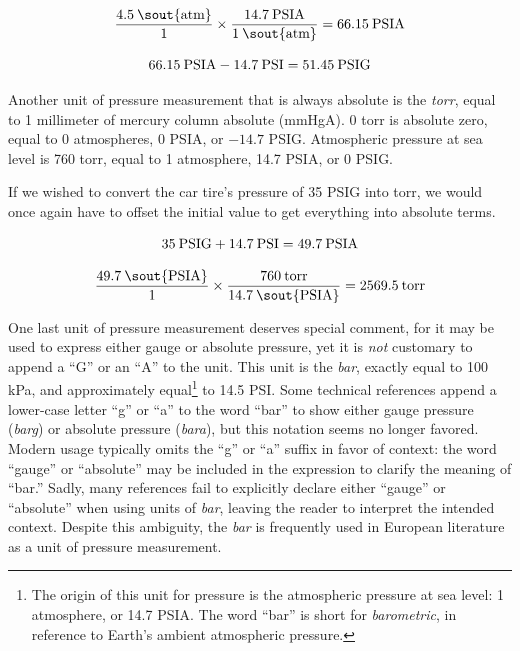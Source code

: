 $${{4.5 \> \hbox{\sout{atm}}} \over 1} \times {{14.7 \> \hbox{PSIA}} \over {1 \> \hbox{\sout{atm}}}} = 66.15 \> \hbox{PSIA}$$

$$66.15 \> \hbox{PSIA} - 14.7 \> \hbox{PSI} = 51.45 \> \hbox{PSIG}$$

Another unit of pressure measurement that is always absolute is the \textit{torr}, equal to 1 millimeter of mercury column absolute (mmHgA).  0 torr is absolute zero, equal to 0 atmospheres, 0 PSIA, or $-14.7$ PSIG.  Atmospheric pressure at sea level is 760 torr, equal to 1 atmosphere, 14.7 PSIA, or 0 PSIG. 

If we wished to convert the car tire's pressure of 35 PSIG into torr, we would once again have to offset the initial value to get everything into absolute terms.

$$35 \> \hbox{PSIG} + 14.7 \> \hbox{PSI} = 49.7 \> \hbox{PSIA}$$

$${{49.7 \> \hbox{\sout{PSIA}}} \over 1} \times {{760 \> \hbox{torr}} \over {14.7 \> \hbox{\sout{PSIA}}}} = 2569.5 \> \hbox{torr}$$

\vskip 10pt

One last unit of pressure measurement deserves special comment, for it may be used to express either gauge or absolute pressure, yet it is \textit{not} customary to append a ``G'' or an ``A'' to the unit.  This unit is the \textit{bar}, exactly equal to 100 kPa, and approximately equal\footnote{The origin of this unit for pressure is the atmospheric pressure at sea level: 1 atmosphere, or 14.7 PSIA.  The word ``bar'' is short for \textit{barometric}, in reference to Earth's ambient atmospheric pressure.} to 14.5 PSI.  Some technical references append a lower-case letter ``g'' or ``a'' to the word ``bar'' to show either gauge pressure (\textit{barg}) or absolute pressure (\textit{bara}), but this notation seems no longer favored.  Modern usage typically omits the ``g'' or ``a'' suffix in favor of context: the word ``gauge'' or ``absolute'' may be included in the expression to clarify the meaning of ``bar.''  Sadly, many references fail to explicitly declare either ``gauge'' or ``absolute'' when using units of \textit{bar}, leaving the reader to interpret the intended context.  Despite this ambiguity, the \textit{bar} is frequently used in European literature as a unit of pressure measurement.      







\filbreak
